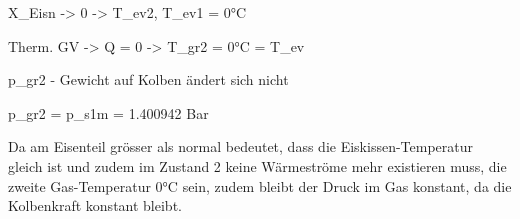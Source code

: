 X_Eisn -> 0 -> T_ev2, T_ev1 = 0°C

Therm. GV -> Q = 0 -> T_gr2 = 0°C = T_ev

p_gr2 - Gewicht auf Kolben ändert sich nicht

p_gr2 = p_s1m = 1.400942 Bar

Da am Eisenteil grösser als normal bedeutet, dass die Eiskissen-Temperatur gleich ist und zudem im Zustand 2 keine Wärmeströme mehr existieren muss, die zweite Gas-Temperatur 0°C sein, zudem bleibt der Druck im Gas konstant, da die Kolbenkraft konstant bleibt.